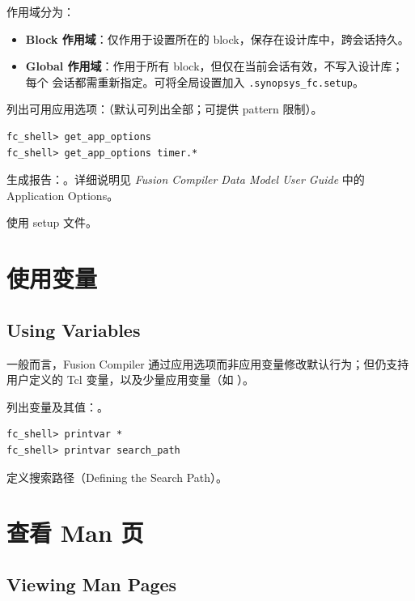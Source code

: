 作用域分为：
\begin{itemize}
  \item \textbf{Block 作用域}：仅作用于设置所在的 block，保存在设计库中，跨会话持久。
  \item \textbf{Global 作用域}：作用于所有 block，但仅在当前会话有效，不写入设计库；每个  会话都需重新指定。可将全局设置加入 \texttt{.synopsys\_fc.setup}。
\end{itemize}

列出可用应用选项：（默认可列出全部；可提供 pattern 限制）。
\begin{lstlisting}
fc_shell> get_app_options
fc_shell> get_app_options timer.*
\end{lstlisting}

生成报告：。详细说明见 \textit{Fusion Compiler Data Model User Guide} 中的 Application Options。

\begin{seeAlsoBox}
使用 setup 文件。
\end{seeAlsoBox}

\section{使用变量}
\subsection*{Using Variables}

一般而言，Fusion Compiler 通过应用选项而非应用变量修改默认行为；但仍支持用户定义的 Tcl 变量，以及少量应用变量（如 ）。

列出变量及其值：。
\begin{lstlisting}
fc_shell> printvar *
fc_shell> printvar search_path
\end{lstlisting}

\begin{seeAlsoBox}
定义搜索路径（Defining the Search Path）。
\end{seeAlsoBox}

\section{查看 Man 页}
\subsection*{Viewing Man Pages}

